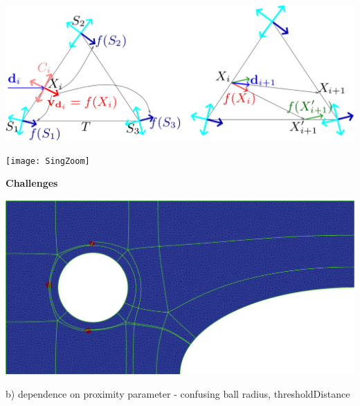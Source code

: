 \documentclass[a0paper,portrait, fontscale=0.33]{baposter}
\begin{document}
\begin{poster}
{\vspace{0.15cm}%
\noindent
\begin{minipage}[!Ht]{0.49\linewidth}
\includegraphics[width=\textwidth]{Heun}
\label{fig:figure7}
\end{minipage}
\hspace{0.005\linewidth}
\begin{minipage}[!Ht]{0.49\linewidth}
\texttt{[image: SingZoom]}
\label{fig:figure8}
\end{minipage}

\bigskip
\noindent
\begin{minipage}[!Ht]{0.49\linewidth}
 \textbf{Challenges}
\newline	
\medskip

\includegraphics[width=\textwidth]{HIS4-sim-Rad002}
\label{fig:figure9}

\bigskip
b) dependence on proximity parameter - confusing ball radius, thresholdDistance


\end{minipage}}
\end{poster}
\end{document}
